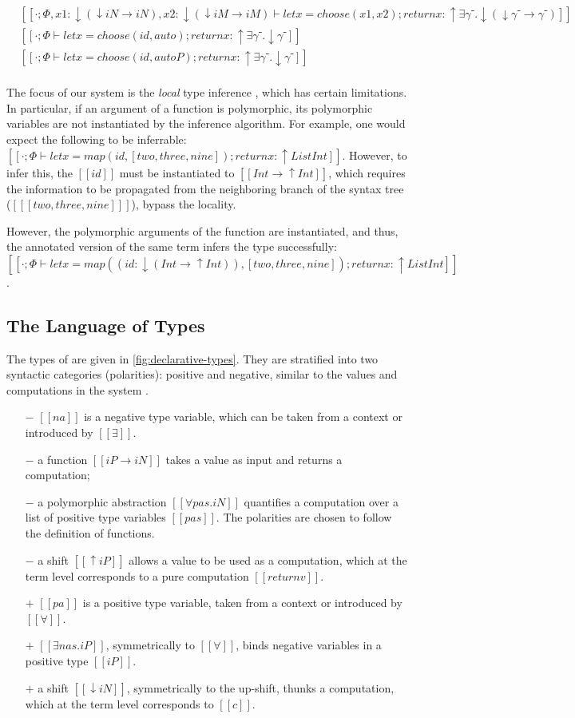 \begin{align*}
  &[[· ; Φ, x1:↓(↓iN → iN), x2:↓(↓iM → iM) ⊢ let x = choose (x1, x2); return x : ↑ ∃γ⁻.↓(↓γ⁻ → γ⁻)]]\\
  &[[· ; Φ ⊢ let x = choose (id, auto); return x : ↑ ∃γ⁻.↓γ⁻]]\\
  &[[· ; Φ ⊢ let x = choose (id, autoP); return x : ↑ ∃γ⁻.↓γ⁻]]\\
\end{align*}

The focus of our system is the \emph{local} type inference \cite{pierce2000:local},
which has certain limitations.
In particular, if an argument of a function is polymorphic,
its polymorphic variables are not instantiated by the inference algorithm. 
For example, one would expect the following to be inferrable:
$[[· ; Φ ⊢ let x = map(id, [two, three, nine]); return x : ↑ List Int]]$.
However, to infer this, the $[[id]]$ must be instantiated to $[[Int → ↑Int]]$, 
which requires the information to be propagated from the neighboring branch 
of the syntax tree ($[[ [two, three, nine] ]]$), \ie bypass the locality. 

However, the polymorphic arguments of the function are instantiated, 
and thus, the annotated version of the same term infers the type successfully:
$[[· ; Φ ⊢ let x = map((id : ↓(Int → ↑Int)), [two, three, nine]); return x : ↑ List Int]]$.


\subsection{The Language of Types}

The types of \fexists are given in \cref{fig:declarative-types}.
They are stratified into two syntactic 
categories (polarities): positive and negative,  
similar to the values and computations in the \CBPV system \cite{levy2006:cbpv}.
\begin{itemize}
\item [$-$] $[[na]]$ is a negative type variable, which can be taken from a context or introduced by $[[∃]]$.
\item [$-$] a function $[[iP → iN]]$ takes a value as input and returns a computation; 
\item [$-$] a polymorphic abstraction $[[∀pas.iN]]$ quantifies a computation over
  a list of positive type variables 
  $[[pas]]$. The polarities are chosen to follow the definition of functions.
\item [$-$] a shift $[[↑iP]]$ allows a value to be used as a computation, 
  which at the term level corresponds to a pure computation $[[return v]]$.
\item [$+$] $[[pa]]$ is a positive type variable, taken from a context or introduced by $[[∀]]$.
\item [$+$] $[[∃nas.iP]]$, symmetrically to $[[∀]]$, 
  binds negative variables in a positive type $[[iP]]$. 
\item [$+$] a shift $[[↓iN]]$, symmetrically to the up-shift, 
  thunks a computation, which at the term level corresponds to $[[ {c} ]]$.
\end{itemize}

